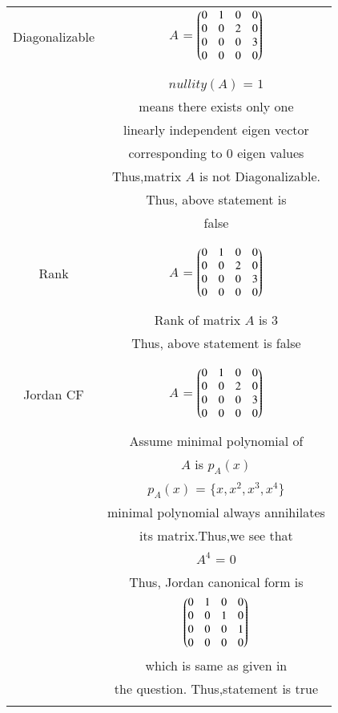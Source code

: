 \documentclass[journal,12pt,twocolumn]{IEEEtran}
\begin{document}
\begin{table}[h!]
\begin{center}
\begin{tabular}{|c|c|}
\hline
Diagonalizable & $A$ = $\begin{pmatrix}0&1&0&0\\
                0&0&2&0\\
                0&0&0&3\\
                0&0&0&0\end{pmatrix}$\\
& \\
& $nullity(A)$ = $1$ \\
& means there exists only one\\
& linearly independent eigen vector\\
& corresponding to $0$ eigen values\\
& Thus,matrix $A$ is not Diagonalizable.\\
& Thus, above statement is\\
& false \\
& \\
\hline
& \\
Rank & $A$ = $\begin{pmatrix}0&1&0&0\\
                0&0&2&0\\
                0&0&0&3\\
                0&0&0&0\end{pmatrix}$\\
& \\
& Rank of matrix $A$ is $3$\\
& Thus, above statement is false\\
& \\
\hline
& \\
Jordan CF & $A$ = $\begin{pmatrix}0&1&0&0\\
                0&0&2&0\\
                0&0&0&3\\
                0&0&0&0\end{pmatrix}$\\
& \\
& Assume minimal polynomial of\\
& $A$ is $p_A(x)$\\
& $p_A(x)$ = $\{x,x^2,x^3,x^4\}$\\
& minimal polynomial always annihilates\\
& its matrix.Thus,we see that\\
& $A^4$ = $0$\\
& Thus, Jordan canonical form is\\
& $\begin{pmatrix}0&1&0&0\\
       0&0&1&0\\
       0&0&0&1\\
       0&0&0&0\end{pmatrix}$\\
& which is same as given in\\
& the question. Thus,statement is true \\
& \\
\hline
\end{tabular}
\end{center}
\end{table}
\end{document}
